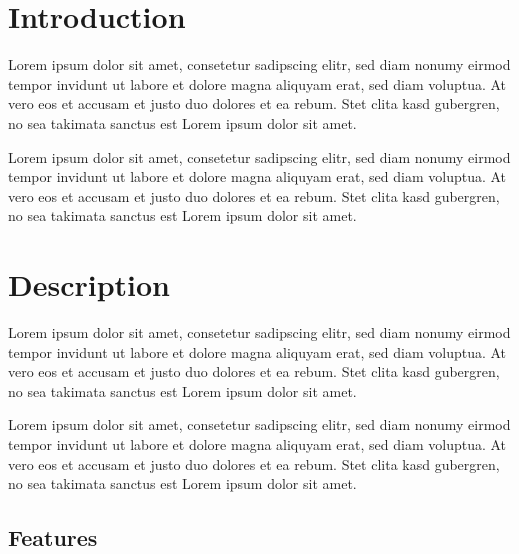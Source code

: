 \documentclass[12pt]{article}
\begin{document}


\tableofcontents
\newpage

\begin{abstract}
This is a \LaTeX~\cite{enwiki:1035188613} document.

Lorem ipsum dolor sit amet, consetetur sadipscing elitr, sed diam nonumy eirmod tempor invidunt ut labore et dolore magna aliquyam erat, sed diam voluptua. At vero eos et accusam et justo duo dolores et ea rebum. Stet clita kasd gubergren, no sea takimata sanctus est Lorem ipsum dolor sit amet.

\end{abstract}

\section{Introduction}

Lorem ipsum dolor sit amet, consetetur sadipscing elitr, sed diam nonumy eirmod tempor invidunt ut labore et dolore magna aliquyam erat, sed diam voluptua. At vero eos et accusam et justo duo dolores et ea rebum. Stet clita kasd gubergren, no sea takimata sanctus est Lorem ipsum dolor sit amet.


Lorem ipsum dolor sit amet, consetetur sadipscing elitr, sed diam nonumy eirmod tempor invidunt ut labore et dolore magna aliquyam erat, sed diam voluptua. At vero eos et accusam et justo duo dolores et ea rebum. Stet clita kasd gubergren, no sea takimata sanctus est Lorem ipsum dolor sit amet.

\section{Description}%

Lorem ipsum dolor sit amet, consetetur sadipscing elitr, sed diam nonumy eirmod tempor invidunt ut labore et dolore magna aliquyam erat, sed diam voluptua. At vero eos et accusam et justo duo dolores et ea rebum. Stet clita kasd gubergren, no sea takimata sanctus est Lorem ipsum dolor sit amet.


Lorem ipsum dolor sit amet, consetetur sadipscing elitr, sed diam nonumy eirmod tempor invidunt ut labore et dolore magna aliquyam erat, sed diam voluptua. At vero eos et accusam et justo duo dolores et ea rebum. Stet clita kasd gubergren, no sea takimata sanctus est Lorem ipsum dolor sit amet.


\subsection{Features}%
\end{document}
